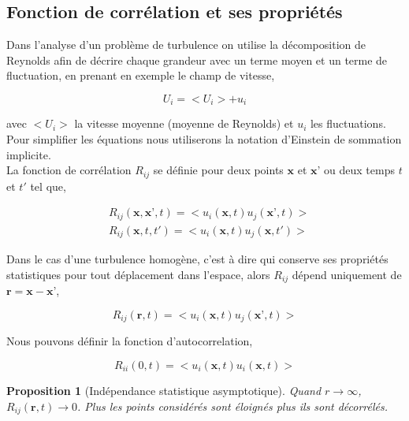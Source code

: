 \documentclass[12pt]{article}
\theoremstyle{plain}
\newtheorem{proposition}[theorem]{Proposition}
\theoremstyle{remark}
\begin{document}
	\subsection{Fonction de corrélation et ses propriétés}
		
		Dans l'analyse d'un problème de turbulence on utilise la décomposition de Reynolds afin de décrire chaque grandeur avec un terme moyen et un terme de fluctuation, en prenant en exemple le champ de vitesse, 
		
		\begin{equation}
			U_i=<U_i> + u_i 	
		\end{equation}
	
		avec $<U_i>$ la vitesse moyenne (moyenne de Reynolds) et $u_i$ les fluctuations. \\
		Pour simplifier les équations nous utiliserons la notation d'Einstein de sommation implicite. \\
		La fonction de corrélation $R_{ij}$ se définie pour deux points $\textbf{x}$ et $\textbf{x'}$ ou deux temps $t$ et $t'$  tel que,
		
		\begin{equation}
		\begin{split}
			&R_{ij}(\textbf{x},\textbf{x'},t) = <u_i(\textbf{x},t) u_j(\textbf{x'},t)> \\
			&R_{ij}(\textbf{x},t,t') = <u_i(\textbf{x},t) u_j(\textbf{x},t')>
		\end{split}
		\end{equation}
	
		Dans le cas d'une turbulence homogène, c'est à dire qui conserve ses propriétés statistiques pour tout déplacement dans l'espace, alors $R_{ij}$ dépend uniquement de $\textbf{r}=\textbf{x}-\textbf{x'}$,
		
		\begin{equation}
			R_{ij}(\textbf{r},t) = <u_i(\textbf{x},t) u_j(\textbf{x'},t)>
			\label{eq:correlation}
		\end{equation}
	
		Nous pouvons définir la fonction d'autocorrelation,
		
		\begin{equation}
			R_{ii}(0,t) = <u_i(\textbf{x},t) u_i(\textbf{x},t)>
		\end{equation}
	
		\begin{proposition}[Indépendance statistique asymptotique]
			Quand $r\rightarrow\infty$, $R_{ij}(\textbf{r},t)\rightarrow0$. Plus les points considérés sont éloignés plus ils sont décorrélés.
		\end{proposition}
	
\end{document}
